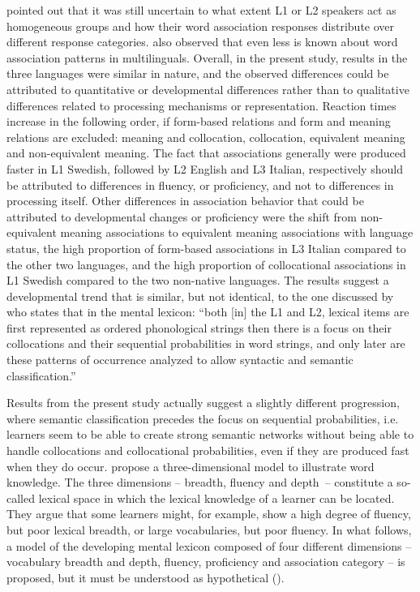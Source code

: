 \documentclass[output=paper,colorlinks,citecolor=brown,nonflat]{langsci/langscibook}
\begin{document}
\citet{CremerEtAl2010} pointed out that it was still uncertain to what extent L1 or L2 speakers act as homogeneous groups and how their word association responses distribute over different response categories. \citeauthor{CremerEtAl2010} also observed that even less is known about word association patterns in multilinguals. Overall, in the present study, results in the three languages were similar in nature, and the observed differences could be attributed to quantitative or developmental differences rather than to qualitative differences related to processing mechanisms or representation. Reaction times increase in the following order, if form-based relations and form and meaning relations are excluded: meaning and collocation, collocation, equivalent meaning and non-equivalent meaning. The fact that associations generally were produced faster in L1 Swedish, followed by L2 English and L3 Italian, respectively should be attributed to differences in fluency, or proficiency, and not to differences in processing itself. Other differences in association behavior that could be attributed to developmental changes or proficiency were the shift from non-equivalent meaning associations to equivalent meaning associations with language status, the high proportion of form-based associations in L3 Italian compared to the other two languages, and the high proportion of collocational associations in L1 Swedish compared to the two non-native languages. The results suggest a developmental trend that is similar, but not identical, to the one discussed by \citet[94]{EllisN1996} who states that in the mental lexicon: “both [in] the L1 and L2, lexical items are first represented as ordered phonological strings then there is a focus on their collocations and their sequential probabilities in word strings, and only later are these patterns of occurrence analyzed to allow syntactic and semantic classification.”

Results from the present study actually suggest a slightly different progression, where semantic classification precedes the focus on sequential probabilities, i.e. learners seem to be able to create strong semantic networks without being able to handle collocations and collocational probabilities, even if they are produced fast when they do occur. \citet{DallerEtAl2007} propose a three-dimensional model to illustrate word knowledge. The three dimensions – breadth, fluency and depth~– constitute a so-called lexical space in which the lexical knowledge of a learner can be located. They argue that some learners might, for example, show a high degree of fluency, but poor lexical breadth, or large vocabularies, but poor fluency. In what follows, a model of the developing mental lexicon composed of four different dimensions – vocabulary breadth and depth, fluency, proficiency and association category – is proposed, but it must be understood as hypothetical ().
\end{document}
